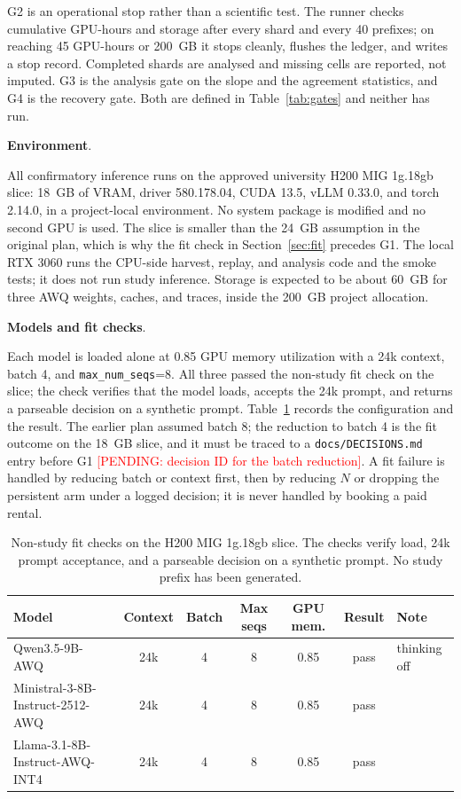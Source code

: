 \documentclass[a4paper,fleqn]{cas-sc}
\newcommand{\pending}[1]{\textcolor{red}{[PENDING: #1]}}
\begin{document}
G2 is an operational stop rather than a scientific test. The runner checks cumulative GPU-hours
and storage after every shard and every 40 prefixes; on reaching 45 GPU-hours or 200~GB it stops
cleanly, flushes the ledger, and writes a stop record. Completed shards are analysed and missing
cells are reported, not imputed. G3 is the analysis gate on the slope and the agreement
statistics, and G4 is the recovery gate. Both are defined in Table~\ref{tab:gates} and neither has
run.



\noindent\textbf{Environment}.\

All confirmatory inference runs on the approved university H200 MIG 1g.18gb slice: 18~GB of
VRAM, driver 580.178.04, CUDA 13.5, vLLM 0.33.0, and torch 2.14.0, in a project-local
environment. No system package is modified and no second GPU is used. The slice is smaller than
the 24~GB assumption in the original plan, which is why the fit check in
Section~\ref{sec:fit} precedes G1. The local RTX 3060 runs the CPU-side harvest, replay, and
analysis code and the smoke tests; it does not run study inference. Storage is expected to be
about 60~GB for three AWQ weights, caches, and traces, inside the 200~GB project allocation.

\noindent\textbf{Models and fit checks}.\ \label{sec:fit}

Each model is loaded alone at 0.85 GPU memory utilization with a 24k context, batch 4, and
\texttt{max\_num\_seqs}=8. All three passed the non-study fit check on the slice; the check
verifies that the model loads, accepts the 24k prompt, and returns a parseable decision on a
synthetic prompt. Table~\ref{tab:fit} records the configuration and the result. The earlier plan
assumed batch 8; the reduction to batch 4 is the fit outcome on the 18~GB slice, and it must be
traced to a \texttt{docs/DECISIONS.md} entry before G1 \pending{decision ID for the batch
reduction}. A fit failure is handled by reducing batch or context first, then by reducing $N$ or
dropping the persistent arm under a logged decision; it is never handled by booking a paid
rental.

\begin{table}[pos=htbp]
  \centering
  \caption{Non-study fit checks on the H200 MIG 1g.18gb slice. The checks verify load, 24k
  prompt acceptance, and a parseable decision on a synthetic prompt. No study prefix has been
  generated.}
  \label{tab:fit}
  \small
  \begin{tabular}{>{\raggedright\arraybackslash}p{4.7cm}ccccc>{\raggedright\arraybackslash}p{2.6cm}}
    \toprule
    \textbf{Model} & \textbf{Context} & \textbf{Batch} & \textbf{Max seqs} & \textbf{GPU mem.} & \textbf{Result} & \textbf{Note} \\
    \midrule
    Qwen3.5-9B-AWQ                   & 24k & 4 & 8 & 0.85 & pass & thinking off \\
    Ministral-3-8B-Instruct-2512-AWQ & 24k & 4 & 8 & 0.85 & pass & \\
    Llama-3.1-8B-Instruct-AWQ-INT4   & 24k & 4 & 8 & 0.85 & pass & \\
    \bottomrule
  \end{tabular}
\end{table}
\end{document}
